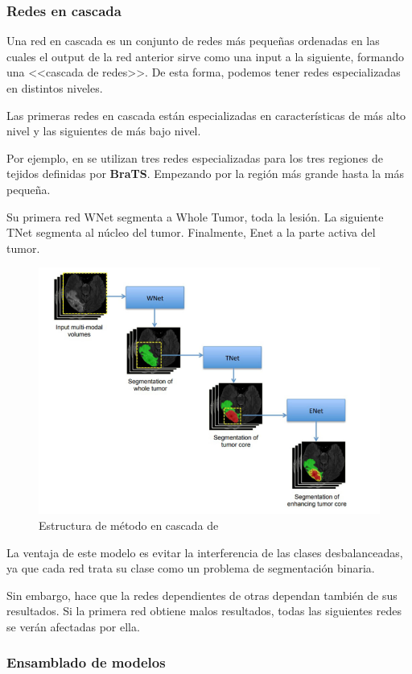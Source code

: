 			\subsubsection{Redes en cascada}
			
			Una red en cascada es un conjunto de redes más pequeñas ordenadas en las cuales el output de la red anterior sirve como una input a la siguiente, formando una  <<cascada de redes>>. De esta forma, podemos tener redes especializadas en distintos niveles. 
			
			Las primeras redes en cascada están especializadas en características de más alto nivel y las siguientes de más bajo nivel.
			
			Por ejemplo, en \cite{wang2018automatic} se utilizan tres redes especializadas para los tres regiones de tejidos definidas por \textbf{BraTS}. Empezando por la región más grande hasta la más pequeña. 
			
			Su primera red WNet segmenta a Whole Tumor, toda la lesión. La siguiente TNet segmenta al núcleo del tumor. Finalmente, Enet a la parte activa del tumor.
			
			
			\begin{figure}[!h]
				\centering
				\includegraphics[width=0.5\linewidth]{imagenes/cascadestructure.png}
				\caption{Estructura de método en cascada de \cite{wang2018automatic}}
			\end{figure}
			
			La ventaja de este modelo es evitar la interferencia de las clases desbalanceadas, ya que cada red trata su clase como un problema de segmentación binaria. 
			
			Sin embargo, hace que la redes dependientes de otras dependan también de sus resultados. Si la primera red obtiene malos resultados, todas las siguientes redes se verán afectadas por ella.
					
			\subsubsection{Ensamblado de modelos}
			

